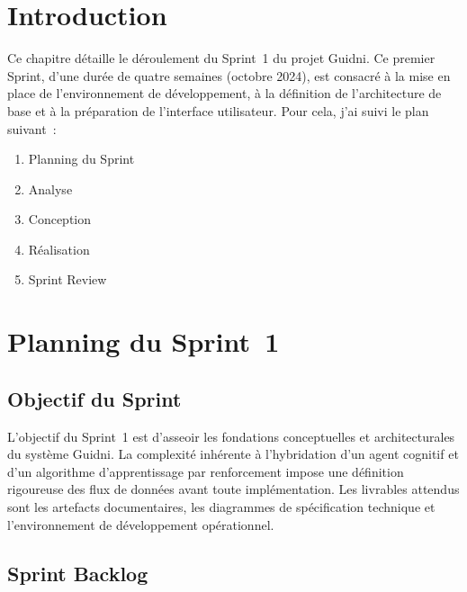 
\section{Introduction}

Ce chapitre détaille le déroulement du Sprint~1 du projet Guidni. Ce premier Sprint, d'une
durée de quatre semaines (octobre 2024), est consacré à la mise en place de l'environnement
de développement, à la définition de l'architecture de base et à la préparation de l'interface
utilisateur. Pour cela, j'ai suivi le plan suivant~:
\begin{enumerate}
    \item Planning du Sprint
    \item Analyse
    \item Conception
    \item Réalisation
    \item Sprint Review
\end{enumerate}


\section{Planning du Sprint~1}

\subsection{Objectif du Sprint}

L'objectif du Sprint~1 est d'asseoir les fondations conceptuelles et architecturales du système
Guidni. La complexité inhérente à l'hybridation d'un agent cognitif et d'un algorithme
d'apprentissage par renforcement impose une définition rigoureuse des flux de données avant
toute implémentation. Les livrables attendus sont les artefacts documentaires, les diagrammes
de spécification technique et l'environnement de développement opérationnel.

\subsection{Sprint Backlog}

